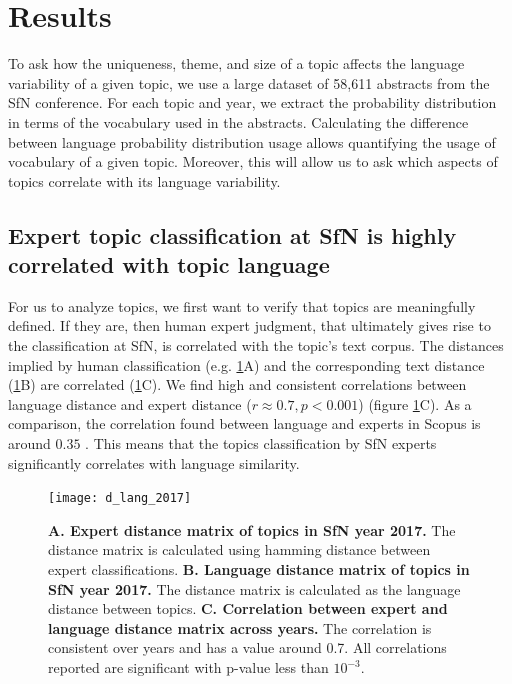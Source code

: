 \documentclass[10pt,letterpaper]{article}
\begin{document}
\section*{Results}

To ask how the uniqueness, theme, and size of a topic affects the language variability of a given topic, we use a large dataset of 58,611 abstracts from the SfN conference. For each topic and year, we extract the probability distribution in terms of the vocabulary used in the abstracts. Calculating the difference between language probability distribution usage allows quantifying the usage of vocabulary of a given topic. Moreover, this will allow us to ask which aspects of topics correlate with its language variability.

\subsection*{Expert topic classification at SfN is highly correlated with topic language}

For us to analyze topics, we first want to verify that topics are meaningfully defined. If they are, then human expert judgment, that ultimately gives rise to the classification at SfN, is correlated with the topic's text corpus. The distances implied by human classification (e.g. \ref{fig:d_lang}A) and the corresponding text distance (\ref{fig:d_lang}B) are correlated (\ref{fig:d_lang}C). We find high and consistent correlations between language distance and expert distance ($r \approx 0.7, p<0.001$) (figure \ref{fig:d_lang}C). As a comparison, the correlation found between language and experts in Scopus is around $0.35$ \cite{dias2017using}. This means that the topics classification by SfN experts significantly correlates with language similarity.

\begin{figure}[ht]
\centering
\texttt{[image: d\_lang\_2017]}
\caption{\textbf{A. Expert distance matrix of topics in SfN year 2017.} The distance matrix is calculated using hamming distance between expert classifications. \textbf{B. Language distance matrix of topics in SfN year 2017.} The distance matrix is calculated as the language distance between topics. \textbf{C. Correlation between expert and language distance matrix across years.} The correlation is consistent over years and has a value around 0.7. All correlations reported are significant with p-value less than $10^{-3}$.}
\label{fig:d_lang}
\end{figure}
\end{document}
